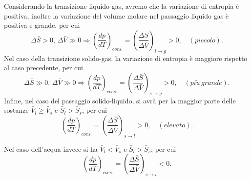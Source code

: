 Considerando la transizione liquido-gas, avremo che la variazione di entropia è positiva, inoltre la variazione del volume molare nel passaggio liquido gas è positiva e grande, per cui
\begin{equation}
    \Delta \bar{S}>0,\,\Delta \bar{V}\gg0\Rightarrow\left(\frac{dp}{dT}\right)_{coes.}=\left(\frac{\Delta \bar{S}}{\Delta \bar{V}}\right)_{l\to g}>0,\quad(piccolo).
\end{equation}
Nel caso della transizione solido-gas, la variazione di entropia è maggiore rispetto al caso precedente, per cui
\begin{equation}
    \Delta \bar{S}\gg0,\,\Delta \bar{V}\gg0\Rightarrow\left(\frac{dp}{dT}\right)_{coes.}=\left(\frac{\Delta \bar{S}}{\Delta \bar{V}}\right)_{s\to g}>0,\quad(pi\grave{u}\,grande).
\end{equation}
Infine, nel caso del passaggio solido-liquido, si avrà per la maggior parte delle sostanze $\bar{V}_l   \geq\bar{V}_s$ e $\bar{S}_l>\bar{S}_s$, per cui
\begin{equation}
    \left(\frac{dp}{dT}\right)_{coes.}=\left(\frac{\Delta \bar{S}}{\Delta \bar{V}}\right)_{s\to l}>0,\quad(elevato).
\end{equation}
\begin{obs}
    Nel caso dell'acqua invece si ha $\bar{V}_l<\bar{V}_s$ e $\bar{S}_l>\bar{S}_s$, per cui
    \begin{equation}
        \left(\frac{dp}{dT}\right)_{coes.}=\left(\frac{\Delta \bar{S}}{\Delta \bar{V}}\right)_{s\to l}<0.
    \end{equation}
\end{obs}

